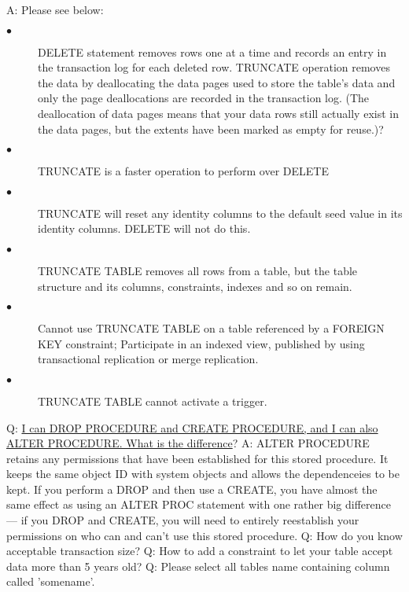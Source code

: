 \documentclass[a4paper,11pt]{article}
\begin{document}
A: Please see below:
\begin{description}
  \item[$\bullet$] DELETE statement removes rows one at a time and records an entry in the transaction log for each deleted row. TRUNCATE operation removes the data by deallocating the data pages used to store the table’s data and only the page deallocations are recorded in the transaction log. (The deallocation of data pages means that your data rows still actually exist in the data pages, but the extents have been marked as empty for reuse.)?
  \item[$\bullet$] TRUNCATE  is a faster operation to perform over DELETE
  \item[$\bullet$] TRUNCATE will reset any identity columns to the default seed value in its identity columns. DELETE will not do this.
  \item[$\bullet$] TRUNCATE TABLE removes all rows from a table, but the table structure and its columns, constraints, indexes and so on remain. 
  \item[$\bullet$] Cannot use TRUNCATE TABLE on a table referenced by a FOREIGN KEY constraint; Participate in an indexed view, published by using transactional replication or merge replication. 
  \item[$\bullet$] TRUNCATE TABLE cannot activate a trigger. 
\end{description}
\noindent 
\newline
Q: \ul{I can DROP PROCEDURE and CREATE PROCEDURE, and I can also ALTER PROCEDURE. What is the difference}? \newline 
A: ALTER PROCEDURE retains any permissions that have been established for this stored procedure. It keeps the same object ID with system objects and allows the dependenceies to be kept. If you perform a DROP and then use a CREATE, you have almost the same effect as using an ALTER PROC statement with one rather big difference — if you DROP and CREATE, you will need to entirely reestablish your permissions on who can and can’t use this stored procedure.\newline\newline
\noindent 
Q: How do you know acceptable transaction size? \newline \newline
\noindent 
Q: How to add a constraint to let your table accept data more than 5 years old? \newline \newline
\noindent 
Q: Please select all tables name containing column called 'somename'. \newline \newline
\end{document}

